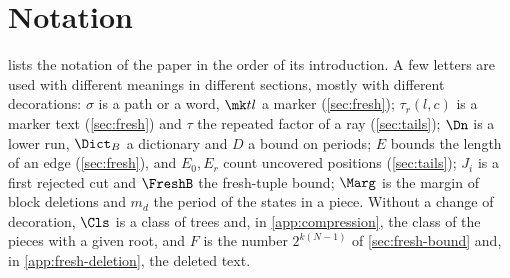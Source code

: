 \section{Notation}
\label{app:notation}

 lists the notation of the paper in the order of its
introduction. A few letters are used with different meanings in different
sections, mostly with different decorations: $\sigma$ is a path or a word,
$\mk tl$ a marker (\cref{sec:fresh}); $\tau_r(l,c)$ is a marker text
(\cref{sec:fresh}) and $\tau$ the repeated factor of a ray
(\cref{sec:tails}); $\Dn$ is a lower run, $\Dict_B$ a dictionary and $D$ a
bound on periods; $E$ bounds the length of an edge (\cref{sec:fresh}), and
$E_0,E_r$ count uncovered positions (\cref{sec:tails}); $J_i$ is a first
rejected cut and $\FreshB$ the fresh-tuple bound; $\Marg$ is the margin of
block deletions and $m_d$ the period of the states in a piece. Without a
change of decoration, $\Cls$ is a class of trees and, in
\cref{app:compression}, the class of the pieces with a given root, and $F$
is the number $2^{k(N-1)}$ of \cref{sec:fresh-bound} and, in
\cref{app:fresh-deletion}, the deleted text.

